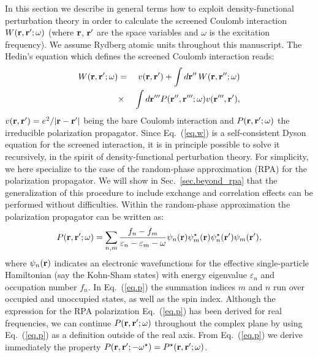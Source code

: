 \documentclass[twocolumn,prb,showpacs,superscriptaddress]{revtex4}
\def\w{\omega}
\def\E{\varepsilon}
\def\r{{\bf r}}
\def\rp{{\bf r^\prime}}
\def\rpp{{\bf r^{\prime\prime}}}
\def\rppp{{\bf r^{\prime\prime\prime}}}
\begin{document}
In this section we describe in general terms how to exploit density-functional
perturbation theory in order to calculate the screened Coulomb interaction
$W(\r,\rp;\w)$ (where $\r$, $\rp$ are the space variables and $\w$ is the
excitation frequency). We assume Rydberg atomic units throughout this manuscript. 
The Hedin's equation which defines the screened Coulomb 
interaction reads:\cite{hl}
  \begin{eqnarray}\label{eq.w}
  W(\r,\rp;\w) & = & v(\r,\rp) + \int d\rpp \,W(\r,\rpp;\w)  \nonumber \\
   & \times & \int d\rppp P(\rpp,\rppp;\w) v(\rppp,\rp),
  \end{eqnarray}
$v(\r,\rp)=e^2/|\r-\rp|$ being the bare Coulomb interaction and 
$P(\r,\rp;\w)$ the irreducible polarization propagator. 
Since Eq.\ (\ref{eq.w}) is a self-consistent Dyson equation for the
screened interaction, it is in principle possible to solve it
recursively, in the spirit of density-functional perturbation theory.
For simplicity, we here specialize to the case of the random-phase approximation (RPA)
for the polarization propagator. We will show in Sec.\ \ref{sec.beyond_rpa}
that the generalization of this procedure to include exchange and correlation
effects can be performed without difficulties.
Within the random-phase approximation the polarization propagator can be written as:\cite{hl}
  \begin{equation}\label{eq.p}
  P(\r,\rp;\w) = \sum_{n,m} \frac{f_n-f_m}{\E_n-\E_m-\w} 
  \psi_n(\r)\psi_m^\star(\r)  \psi_n^\star(\rp)\psi_m(\rp),
  \end{equation}
where $\psi_n(\r)$ indicates an electronic wavefunctions for the
effective single-particle Hamiltonian (say the Kohn-Sham states)
with energy eigenvalue $\E_n$ and occupation number $f_n$. 
In Eq.\ (\ref{eq.p}) the summation indices $m$ and $n$ run over
occupied and unoccupied states, as well as the spin index.
Although the expression for the RPA polarization Eq.\ (\ref{eq.p})
has been derived for real frequencies,\cite{hl} we can continue
$P(\r,\rp;\w)$ throughout the complex plane by using Eq.~(\ref{eq.p})
as a definition outside of the real axis.
From Eq.\ (\ref{eq.p}) we derive immediately the property 
$P(\r,\rp;-\w^\star)=P^\star(\r,\rp;\w)$.
\end{document}
